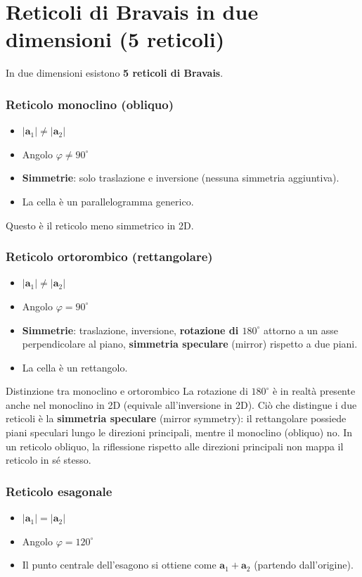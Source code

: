\section{Reticoli di Bravais in due dimensioni (5 reticoli)}

In due dimensioni esistono \textbf{5 reticoli di Bravais}.

\subsubsection{Reticolo monoclino (obliquo)}
\begin{itemize}
    \item $|\mathbf{a}_1| \neq |\mathbf{a}_2|$
    \item Angolo $\varphi \neq 90^\circ$
    \item \textbf{Simmetrie}: solo traslazione e inversione (nessuna simmetria aggiuntiva).
    \item La cella è un parallelogramma generico.
\end{itemize}
Questo è il reticolo meno simmetrico in 2D.

\subsubsection{Reticolo ortorombico (rettangolare)}
\begin{itemize}
    \item $|\mathbf{a}_1| \neq |\mathbf{a}_2|$
    \item Angolo $\varphi = 90^\circ$
    \item \textbf{Simmetrie}: traslazione, inversione, \textbf{rotazione di $180^\circ$} attorno a un asse perpendicolare al piano, \textbf{simmetria speculare} (mirror) rispetto a due piani.
    \item La cella è un rettangolo.
\end{itemize}

\begin{definizione}{Distinzione tra monoclino e ortorombico} 
La rotazione di $180^\circ$ è in realtà presente anche nel monoclino in 2D (equivale all'inversione in 2D). Ciò che distingue i due reticoli è la \textbf{simmetria speculare} (mirror symmetry): il rettangolare possiede piani speculari lungo le direzioni principali, mentre il monoclino (obliquo) no. In un reticolo obliquo, la riflessione rispetto alle direzioni principali non mappa il reticolo in sé stesso.
\end{definizione}

\subsubsection{Reticolo esagonale}
\begin{itemize}
    \item $|\mathbf{a}_1| = |\mathbf{a}_2|$
    \item Angolo $\varphi = 120^\circ$
    \item Il punto centrale dell'esagono si ottiene come $\mathbf{a}_1 + \mathbf{a}_2$ (partendo dall'origine).
\end{itemize}

